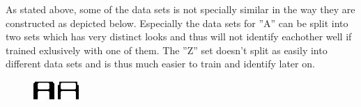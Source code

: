 As stated above, some of the data sets is not specially similar in the way they
are constructed as depicted below.  Especially the data sets for ''A'' can be split
into two sets which has very distinct looks and thus will not identify eachother
well if trained exlusively with one of them.  The ''Z'' set doesn't split as
easily into different data sets and is thus much easier to train and identify
later on. 

\begin{figure}[h]
\centering
\begin{minipage}{0.04\textwidth}
	\includegraphics[width=\textwidth]{../pics/A1}
\end{minipage}
\begin{minipage}{0.04\textwidth}
	\includegraphics[width=\textwidth]{../pics/A2}

\end{minipage}
\end{figure}
